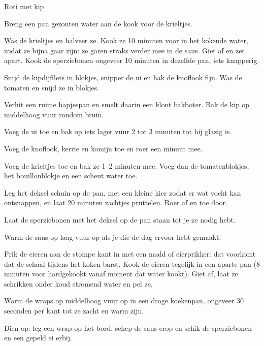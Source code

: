 \begin{recipe}{Roti met kip}
\begin{steps}
  \item Breng een pan gezouten water aan de kook voor de krieltjes.
  \item Was de krieltjes en halveer ze. Kook ze 10 minuten voor in het kokende water, zodat ze
        bijna gaar zijn: ze garen straks verder mee in de saus. Giet af en zet apart. Kook
        de sperziebonen ongeveer 10 minuten in dezelfde pan, iets knapperig.
  \item Snijd de kipdijfilets in blokjes, snipper de ui en hak de knoflook fijn. Was de
        tomaten en snijd ze in blokjes.
  \item Verhit een ruime hapjespan en smelt daarin een klont bakboter. Bak de kip op
        middelhoog vuur rondom bruin.
  \item Voeg de ui toe en bak op iets lager vuur 2 tot 3 minuten tot hij glazig is.
  \item Voeg de knoflook, kerrie en komijn toe en roer een minuut mee.
  \item Voeg de krieltjes toe en bak ze 1--2 minuten mee. Voeg dan de tomatenblokjes,
        het bouillonblokje en een scheut water toe.
  \item Leg het deksel schuin op de pan, met een kleine kier zodat er wat vocht kan
        ontsnappen, en laat 20 minuten zachtjes pruttelen. Roer af en toe door.
  \item Laat de sperziebonen met het deksel op de pan staan tot je ze nodig hebt.
  \item Warm de saus op laag vuur op als je die de dag ervoor hebt gemaakt.
  \item Prik de eieren aan de stompe kant in met een naald of eierprikker: dat
        voorkomt dat de schaal tijdens het koken barst. Kook de eieren tegelijk
        in een aparte pan (8 minuten voor hardgekookt vanaf moment dat water
        kookt). Giet af, laat ze schrikken onder koud stromend water en pel ze.
  \item Warm de wraps op middelhoog vuur op in een droge koekenpan, ongeveer
        30 seconden per kant tot ze zacht en warm zijn.
  \item Dien op: leg een wrap op het bord, schep de saus erop en schik de sperziebonen
        en een gepeld ei erbij.
\end{steps}
\end{recipe}
